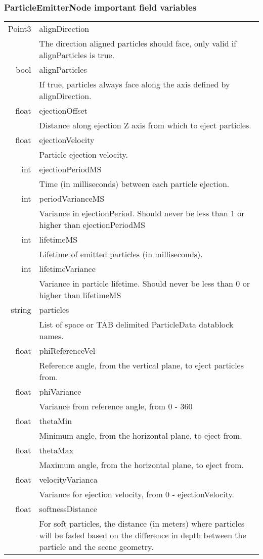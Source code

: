 \begin{frame}
\frametitle{ParticleEmitterNode important field variables}
\hypertarget{QG-pNode}{}
\begin{center}
\begin{tabular}{r p{10cm}}
\hline
Point3 & alignDirection\\
 & The direction aligned particles should face, only valid if alignParticles is true.\\
\hline
bool & alignParticles\\
 & If true, particles always face along the axis defined by alignDirection. \\
 \hline
float & ejectionOffset\\
 & Distance along ejection Z axis from which to eject particles.\\
 \hline
float & ejectionVelocity\\
 & Particle ejection velocity.\\
 \hline
int & ejectionPeriodMS\\
 &  Time (in milliseconds) between each particle ejection.\\
 \hline
int & periodVarianceMS\\
 & Variance in ejectionPeriod. Should never be less than 1 or higher than ejectionPeriodMS\\
 \hline
int & lifetimeMS\\
 & Lifetime of emitted particles (in milliseconds).\\
 \hline
int & lifetimeVariance\\
 & Variance in particle lifetime. Should never be less than 0 or higher than lifetimeMS\\
 \hline
string & particles\\
 & List of space or TAB delimited ParticleData datablock names.\\
 \hline
float & phiReferenceVel\\
 & Reference angle, from the vertical plane, to eject particles from.\\
 \hline
float & phiVariance\\
 & Variance from reference angle, from 0 - 360\\
 \hline
float & thetaMin\\
 & Minimum angle, from the horizontal plane, to eject from.\\
 \hline
float & thetaMax\\
 & Maximum angle, from the horizontal plane, to eject from.\\
 \hline
float & velocityVarianca\\
 & Variance for ejection velocity, from 0 - ejectionVelocity. \\
 \hline
float & softnessDistance\\
 & For soft particles, the distance (in meters) where particles will be faded based on the difference in depth between the particle and the scene geometry. \\
 \hline
\end{tabular}
\end{center}
\end{frame}

